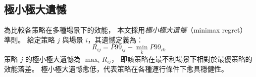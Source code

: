 \subsection{極小極大遺憾}

為比較各策略在多種場景下的效能，
本文採用\emph{極小極大遺憾}（minimax regret）準則。
給定策略 $j$ 與場景 $i$，其遺憾定義為：
\[
  R_{ij} = P99_{ij} - \min_k P99_{ik}
\]
策略 $j$ 的極小極大遺憾為 $\max_i R_{ij}$，
即該策略在最不利場景下相對於最優策略的效能落差。
極小極大遺憾愈低，代表策略在各種運行條件下愈具穩健性。
